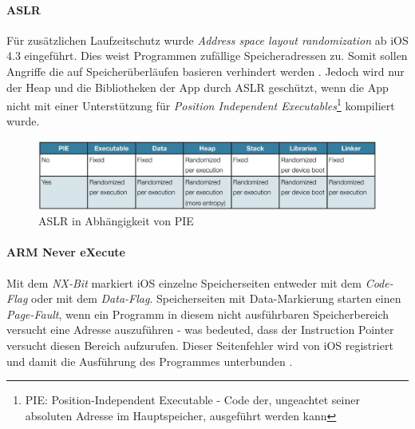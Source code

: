 		\paragraph{ASLR}\label{sec:ios-aslr}
			Für zusätzlichen Laufzeitschutz wurde \textsl{Address space layout
			randomization} \cite[S. 1]{iOS4SecurityEvalutaion} ab iOS 4.3 eingeführt.
			Dies weist Programmen zufällige Speicheradressen zu. Somit sollen Angriffe die auf
			Speicherüberläufen basieren verhindert werden \cite[S. 131]{Levin2012}.
			Jedoch wird nur der Heap und die Bibliotheken der App durch
			ASLR geschützt, wenn die App nicht mit einer Unterstützung für
			\textsl{Position Independent Executables}\footnote{PIE: Position-Independent
			Executable - Code der, ungeachtet seiner absoluten Adresse im Hauptspeicher,
			ausgeführt werden kann} kompiliert wurde.
			\begin{figure}[h]
				\centering
				\includegraphics[width=0.9\linewidth]{ios/media/aslr-pie.jpg}
				\caption{ASLR in Abhängigkeit von PIE
				\cite[S. 1]{iOS4SecurityEvalutaion}}
				\label{fig:aslr}
			\end{figure}
		
		\paragraph{ARM Never eXecute}
			Mit dem \textsl{NX-Bit} markiert iOS einzelne Speicherseiten entweder mit dem
			\textsl{Code-Flag} oder mit dem \textsl{Data-Flag}. Speicherseiten mit
			Data-Markierung starten einen \textsl{Page-Fault}, wenn ein Programm in
			diesem nicht ausführbaren Speicherbereich versucht eine Adresse auszuführen
			- was bedeuted, dass der Instruction Pointer versucht diesen Bereich
			aufzurufen. Dieser Seitenfehler wird von iOS registriert und damit die
			Ausführung des Programmes unterbunden \cite[S. 310]{Levin2012}.